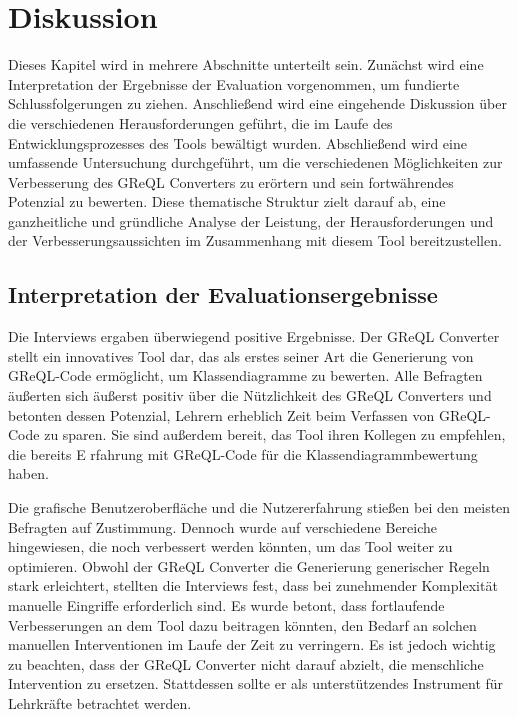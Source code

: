 \chapter{Diskussion}

Dieses Kapitel wird in mehrere Abschnitte unterteilt sein. Zunächst wird eine Interpretation der Ergebnisse der
Evaluation vorgenommen, um fundierte Schlussfolgerungen zu ziehen. Anschließend wird eine eingehende Diskussion über
die verschiedenen Herausforderungen geführt, die im Laufe des Entwicklungsprozesses des Tools bewältigt wurden.
Abschließend wird eine umfassende Untersuchung durchgeführt, um die verschiedenen Möglichkeiten zur Verbesserung des
GReQL Converters zu erörtern und sein fortwährendes Potenzial zu bewerten. Diese thematische Struktur zielt darauf ab,
eine ganzheitliche und gründliche Analyse der Leistung, der Herausforderungen und der Verbesserungsaussichten im
Zusammenhang mit diesem Tool bereitzustellen.

\section{Interpretation der Evaluationsergebnisse}


Die Interviews ergaben überwiegend positive Ergebnisse. Der GReQL Converter stellt ein innovatives Tool dar, das als
erstes seiner Art die Generierung von GReQL-Code ermöglicht, um Klassendiagramme zu bewerten. Alle Befragten äußerten
sich äußerst positiv über die Nützlichkeit des GReQL Converters und betonten dessen Potenzial, Lehrern erheblich Zeit
beim Verfassen von GReQL-Code zu sparen. Sie sind außerdem bereit, das Tool ihren Kollegen zu empfehlen, die bereits E
rfahrung mit GReQL-Code für die Klassendiagrammbewertung haben.

Die grafische Benutzeroberfläche und die Nutzererfahrung stießen bei den meisten Befragten auf Zustimmung.
Dennoch wurde auf verschiedene Bereiche hingewiesen, die noch verbessert werden könnten, um das Tool weiter zu
optimieren. Obwohl der GReQL Converter die Generierung generischer Regeln stark erleichtert, stellten die Interviews
fest, dass bei zunehmender Komplexität manuelle Eingriffe erforderlich sind. Es wurde betont, dass fortlaufende
Verbesserungen an dem Tool dazu beitragen könnten, den Bedarf an solchen manuellen Interventionen im Laufe der Zeit zu
verringern. Es ist jedoch wichtig zu beachten, dass der GReQL Converter nicht darauf abzielt, die menschliche
Intervention zu ersetzen. Stattdessen sollte er als unterstützendes Instrument für Lehrkräfte betrachtet werden.


